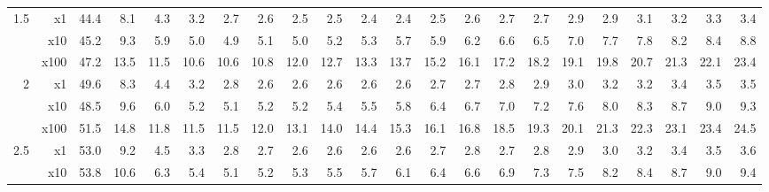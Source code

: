 \documentclass[12pt,preprint]{aastex}
\begin{document}
\begin{appendices}
\begin{table}
\begin{centering}
\begin{tabular}{r|r|rrrrrrrrrrrrrrrrrrrr}
        \hline
             1.5 &       x1 &       44.4 &        8.1 &        4.3 &        3.2 &        2.7 &        2.6 &        2.5 &        2.5 &        2.4 &        2.4 &        2.5 &        2.6 &        2.7 &        2.7 &        2.9 &        2.9 &        3.1 &        3.2 &        3.3 &        3.4 \\
                 &      x10 &       45.2 &        9.3 &        5.9 &        5.0 &        4.9 &        5.1 &        5.0 &        5.2 &        5.3 &        5.7 &        5.9 &        6.2 &        6.6 &        6.5 &        7.0 &        7.7 &        7.8 &        8.2 &        8.4 &        8.8 \\
                 &     x100 &       47.2 &       13.5 &       11.5 &       10.6 &       10.6 &       10.8 &       12.0 &       12.7 &       13.3 &       13.7 &       15.2 &       16.1 &       17.2 &       18.2 &       19.1 &       19.8 &       20.7 &       21.3 &       22.1 &       23.4 \\
               2 &       x1 &       49.6 &        8.3 &        4.4 &        3.2 &        2.8 &        2.6 &        2.6 &        2.6 &        2.6 &        2.6 &        2.7 &        2.7 &        2.8 &        2.9 &        3.0 &        3.2 &        3.2 &        3.4 &        3.5 &        3.5 \\
                 &      x10 &       48.5 &        9.6 &        6.0 &        5.2 &        5.1 &        5.2 &        5.2 &        5.4 &        5.5 &        5.8 &        6.4 &        6.7 &        7.0 &        7.2 &        7.6 &        8.0 &        8.3 &        8.7 &        9.0 &        9.3 \\
                 &     x100 &       51.5 &       14.8 &       11.8 &       11.5 &       11.5 &       12.0 &       13.1 &       14.0 &       14.4 &       15.3 &       16.1 &       16.8 &       18.5 &       19.3 &       20.1 &       21.3 &       22.3 &       23.1 &       23.4 &       24.5 \\
             2.5 &       x1 &       53.0 &        9.2 &        4.5 &        3.3 &        2.8 &        2.7 &        2.6 &        2.6 &        2.6 &        2.6 &        2.7 &        2.8 &        2.7 &        2.8 &        2.9 &        3.0 &        3.2 &        3.4 &        3.5 &        3.6 \\
                 &      x10 &       53.8 &       10.6 &        6.3 &        5.4 &        5.1 &        5.2 &        5.3 &        5.5 &        5.7 &        6.1 &        6.4 &        6.6 &        6.9 &        7.3 &        7.5 &        8.2 &        8.4 &        8.7 &        9.0 &        9.4 \\

\end{tabular}
\end{centering}
\end{table}
\end{appendices}
\end{document}
